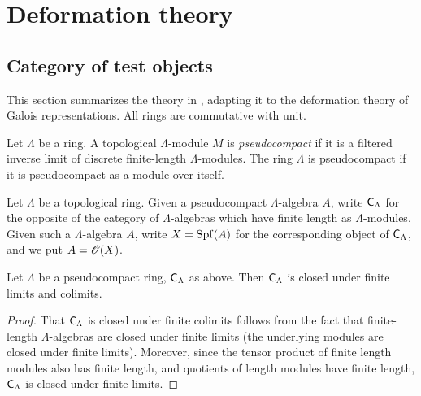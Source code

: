 
\chapter{Deformation theory}





\section{Category of test objects}

This section summarizes the theory in 
\cite[VII\textsubscript{B}, \S 0--1]{sga3-1}, adapting it to the deformation 
theory of Galois representations. All rings are commutative with unit. 

\begin{definition}
Let $\Lambda$ be a ring. A topological $\Lambda$-module $M$ is 
\emph{pseudocompact} if it is a filtered inverse limit of discrete 
finite-length $\Lambda$-modules. The ring $\Lambda$ is pseudocompact if it 
is pseudocompact as a module over itself. 
\end{definition}

Let $\Lambda$ be a topological ring. Given a pseudocompact $\Lambda$-algebra 
$A$, write $\mathsf{C}_\Lambda$ for the opposite 
of the category of $\Lambda$-algebras which have finite length as 
$\Lambda$-modules. Given such a $\Lambda$-algebra $A$, write $X=\operatorname{Spf}(A)$ for 
the corresponding object of $\mathsf{C}_\Lambda$, and we put $A=\mathscr{O}(X)$. 

\begin{lemma}
Let $\Lambda$ be a pseudocompact ring, $\mathsf{C}_\Lambda$ as above. Then 
$\mathsf{C}_\Lambda$ is closed under finite limits and colimits. 
\end{lemma}
\begin{proof}
That $\mathsf{C}_\Lambda$ is closed under finite colimits follows from the fact that 
finite-length $\Lambda$-algebras are closed under finite limits (the 
underlying modules are closed under finite limits). Moreover, since the tensor 
product of finite length modules also has finite length, and quotients of 
length modules have finite length, $\mathsf{C}_\Lambda$ is closed under finite 
limits. 
\end{proof}

